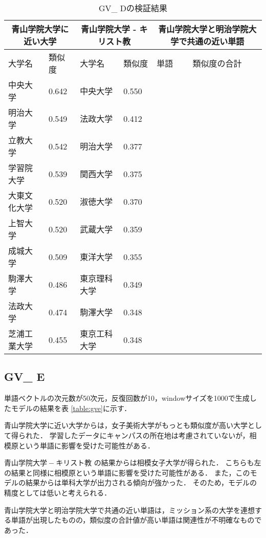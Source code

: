 \begin{table}[H]
\caption{GV\_ Dの検証結果}
\centering
\footnotesize
\begin{tabular}{ll|ll|ll}
\hline
\multicolumn{2}{c}{青山学院大学に近い大学} & \multicolumn{2}{c}{青山学院大学 - キリスト教} & \multicolumn{2}{c}{青山学院大学と明治学院大学で共通の近い単語}
\\ \hline
大学名 & 類似度 & 大学名 & 類似度 & 単語 & 類似度の合計
\\ \hline \hline
中央大学 & 0.642 & 中央大学 & 0.550 & & \\
明治大学 & 0.549 & 法政大学 & 0.412 & & \\
立教大学 & 0.542 & 明治大学 & 0.377 & & \\
学習院大学 & 0.539 & 関西大学 & 0.375 & & \\
大東文化大学 & 0.520 & 淑徳大学 & 0.370 & & \\
上智大学 & 0.520 & 武蔵大学 & 0.359 & & \\
成城大学 & 0.509 & 東洋大学 & 0.355 & & \\
駒澤大学 & 0.486 & 東京理科大学 & 0.349 & & \\
法政大学 & 0.474 & 駒澤大学 & 0.348 & & \\
芝浦工業大学 & 0.455 & 東京工科大学 & 0.348 & & \\ \hline
\end{tabular}
\label{table:gvd}
\end{table}

\subsection{GV\_ E}
単語ベクトルの次元数が50次元，反復回数が10，windowサイズを1000で生成したモデルの結果を表 \ref{table:gve}に示す．

青山学院大学に近い大学からは，女子美術大学がもっとも類似度が高い大学として得られた．
学習したデータにキャンパスの所在地は考慮されていないが，相模原という単語に影響を受けた可能性がある．

$ 青山学院大学 - キリスト教 $ の結果からは相模女子大学が得られた．
こちらも左の結果と同様に相模原という単語に影響を受けた可能性がある．
また，このモデルの結果からは単科大学が出力される傾向が強かった．
そのため，モデルの精度としては低いと考えられる．

青山学院大学と明治学院大学で共通の近い単語は，ミッション系の大学を連想する単語が出現したものの，類似度の合計値が高い単語は関連性が不明確なものであった．

